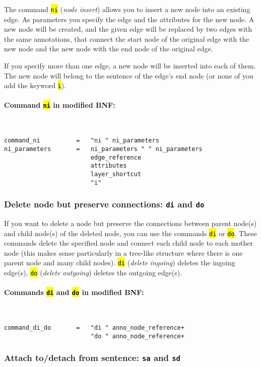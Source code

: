 \documentclass[12pt]{scrartcl}
\newcommand{\code}[1]{\hl{\texttt{#1}}}
\begin{document}
The command \code{ni} (\textit{node insert}) allows you to insert a new node into an existing edge.
As parameters you specify the edge and the attributes for the new node.
A new node will be created, and the given edge will be replaced by two edges with the same annotations, that connect the start node of the original edge with the new node and the new node with the end node of the original edge.

If you specify more than one edge, a new node will be inserted into each of them.
The new node will belong to the sentence of the edge’s end node (or none of you add the keyword \code{i}).

\paragraph*{Command \code{ni} in modified BNF:}
~
\begin{lstlisting}
command_ni          =   "ni " ni_parameters
ni_parameters       =   ni_parameters " " ni_parameters
                        edge_reference
                        attributes
                        layer_shortcut
                        "i"
\end{lstlisting}


\subsubsection{Delete node but preserve connections: \texttt{di} and \texttt{do}}

If you want to delete a node but preserve the connections between parent node(s) and child node(s) of the deleted node, you can use the commands \code{di} or \code{do}.
These commands delete the specified node and connect each child node to each mother node (this makes sense particularly in a tree-like structure where there is one parent node and many child nodes).
\code{di} (\textit{delete ingoing}) deletes the ingoing edge(s), \code{do} (\textit{delete outgoing}) deletes the outgoing edge(s).

\paragraph*{Commands \code{di} and \code{do} in modified BNF:}
~
\begin{lstlisting}
command_di_do       =   "di " anno_node_reference+
                        "do " anno_node_reference+
\end{lstlisting}


\subsubsection{Attach to/detach from sentence: \texttt{sa} and \texttt{sd}}
\end{document}
